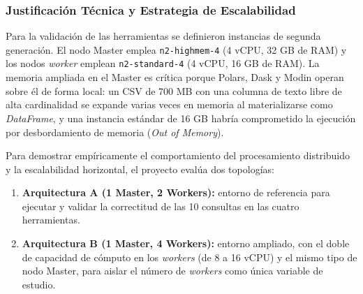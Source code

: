 \subsubsection{Justificación Técnica y Estrategia de Escalabilidad}
Para la validación de las herramientas se definieron instancias de segunda generación. El nodo Master emplea \texttt{n2-highmem-4} (4 vCPU, 32 GB de RAM) y los nodos \textit{worker} emplean \texttt{n2-standard-4} (4 vCPU, 16 GB de RAM). La memoria ampliada en el Master es crítica porque Polars, Dask y Modin operan sobre él de forma local: un CSV de 700 MB con una columna de texto libre de alta cardinalidad se expande varias veces en memoria al materializarse como \textit{DataFrame}, y una instancia estándar de 16 GB habría comprometido la ejecución por desbordamiento de memoria (\textit{Out of Memory}).

Para demostrar empíricamente el comportamiento del procesamiento distribuido y la escalabilidad horizontal, el proyecto evalúa dos topologías:

\begin{enumerate}[leftmargin=*]
    \item \textbf{Arquitectura A (1 Master, 2 Workers):} entorno de referencia para ejecutar y validar la correctitud de las 10 consultas en las cuatro herramientas.
    \item \textbf{Arquitectura B (1 Master, 4 Workers):} entorno ampliado, con el doble de capacidad de cómputo en los \textit{workers} (de 8 a 16 vCPU) y el mismo tipo de nodo Master, para aislar el número de \textit{workers} como única variable de estudio.
\end{enumerate}

